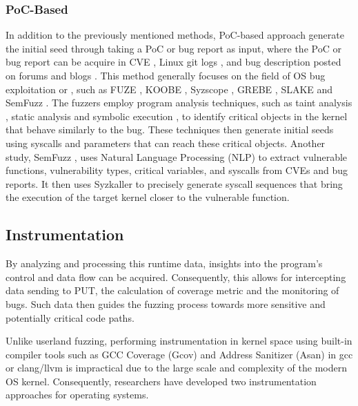 \subsubsection{PoC-Based}

In addition to the previously mentioned methods, PoC-based approach generate the initial seed through taking a PoC or bug report as input, where the PoC or bug report can be acquire in CVE \cite{cve}, Linux git logs \cite{linuxkernel}, and bug description posted on forums and blogs \cite{fulldisclosure, sans, krebsonsecurity}. This method generally focuses on the field of OS bug exploitation or , such as FUZE \cite{wu2018fuze}, KOOBE \cite{chen2020koobe}, Syzscope \cite{zou2022syzscope}, GREBE \cite{lin2022grebe}, SLAKE \cite{chen2019slake} and SemFuzz \cite{you2017semfuzz}. The fuzzers employ program analysis techniques, such as taint analysis \cite{zou2022syzscope,lin2022grebe}, static analysis \cite{chen2019slake} and symbolic execution \cite{wu2018fuze, chen2020koobe}, to identify critical objects in the kernel that behave similarly to the bug. These techniques then generate initial seeds using syscalls and parameters that can reach these critical objects. Another study, SemFuzz \cite{you2017semfuzz}, uses Natural Language Processing (NLP) to extract vulnerable functions, vulnerability types, critical variables, and syscalls from CVEs and bug reports. It then uses Syzkaller to precisely generate syscall sequences that bring the execution of the target kernel closer to the vulnerable function.

\subsection{Instrumentation}
\label{subsection4.2}
 By analyzing and processing this runtime data, insights into the program's control and data flow can be acquired. Consequently, this allows for intercepting data sending to PUT, the calculation of coverage metric and the monitoring of bugs. Such data then guides the fuzzing process towards more sensitive and potentially critical code paths.

Unlike userland fuzzing, performing instrumentation in kernel space using built-in compiler tools such as GCC Coverage (Gcov) \cite{gcov} and Address Sanitizer (Asan) \cite{ASAN} in gcc or clang/llvm is impractical due to the large scale and complexity of the modern OS kernel. Consequently, researchers have developed two instrumentation approaches for operating systems.

